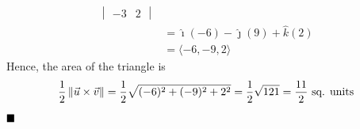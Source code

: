 \begin{enumerate}
\begin{align*}
\begin{vmatrix}
                                                                                                               -3 & 2
                                                                                                           \end{vmatrix} \\
                                     & = \hat{\imath}(-6) - \hat{\jmath}(9) + \hat{k}(2)                                  \\
                                     & = \langle -6, -9, 2 \rangle
          \end{align*}
          Hence, the area of the triangle is \[\frac{1}{2}\left\lVert\vec{u} \times \vec{v}\right\rVert = \frac{1}{2}\sqrt{(-6)^2 + (-9)^2 + 2^2} = \frac{1}{2}\sqrt{121} = \frac{11}{2} \text{ sq. units}\]
          $\hfill\blacksquare$


\end{enumerate}
